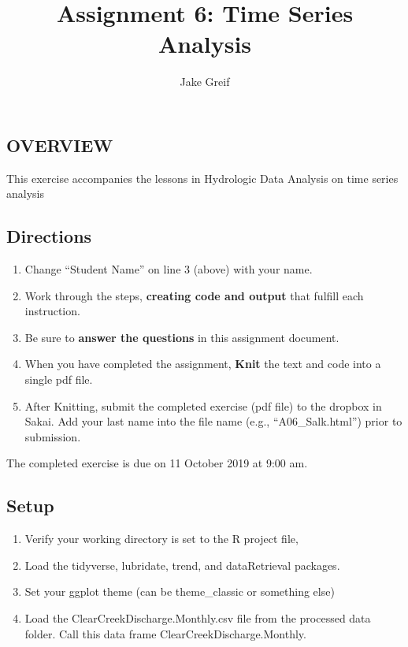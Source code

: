 \documentclass[]{article}
\title{Assignment 6: Time Series Analysis}
\author{Jake Greif}
\date{}
\providecommand{\tightlist}{%
  \setlength{\itemsep}{0pt}\setlength{\parskip}{0pt}}
\begin{document}
\maketitle

\hypertarget{overview}{%
\subsection{OVERVIEW}\label{overview}}

This exercise accompanies the lessons in Hydrologic Data Analysis on
time series analysis

\hypertarget{directions}{%
\subsection{Directions}\label{directions}}

\begin{enumerate}
\def\labelenumi{\arabic{enumi}.}
\tightlist
\item
  Change ``Student Name'' on line 3 (above) with your name.
\item
  Work through the steps, \textbf{creating code and output} that fulfill
  each instruction.
\item
  Be sure to \textbf{answer the questions} in this assignment document.
\item
  When you have completed the assignment, \textbf{Knit} the text and
  code into a single pdf file.
\item
  After Knitting, submit the completed exercise (pdf file) to the
  dropbox in Sakai. Add your last name into the file name (e.g.,
  ``A06\_Salk.html'') prior to submission.
\end{enumerate}

The completed exercise is due on 11 October 2019 at 9:00 am.

\hypertarget{setup}{%
\subsection{Setup}\label{setup}}

\begin{enumerate}
\def\labelenumi{\arabic{enumi}.}
\tightlist
\item
  Verify your working directory is set to the R project file,
\item
  Load the tidyverse, lubridate, trend, and dataRetrieval packages.
\item
  Set your ggplot theme (can be theme\_classic or something else)
\item
  Load the ClearCreekDischarge.Monthly.csv file from the processed data
  folder. Call this data frame ClearCreekDischarge.Monthly.
\end{enumerate}
\end{document}
